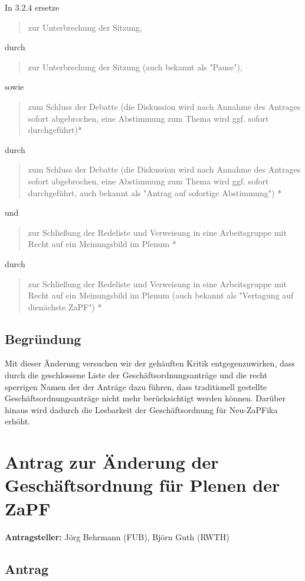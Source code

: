\documentclass[draft,10pt,oneside]{scrartcl}
\begin{document}
In 3.2.4 ersetze
\begin{quote}
	zur Unterbrechung der Sitzung,
\end{quote}
durch
\begin{quote}
	zur Unterbrechung der Sitzung (auch bekannt als "Pause"),
\end{quote}
sowie
\begin{quote}
	zum Schluss der Debatte (die Diskussion wird nach Annahme des Antrages
	sofort abgebrochen, eine Abstimmung zum Thema wird ggf. sofort
	durchgeführt)*
\end{quote}
durch
\begin{quote}
	zum Schluss der Debatte (die Diskussion wird nach Annahme des Antrages
	sofort abgebrochen, eine Abstimmung zum Thema wird ggf. sofort
	durchgeführt, auch bekannt als "Antrag auf sofortige Abstimmung") *
\end{quote}
und
\begin{quote}
	zur Schließung der Redeliste und Verweisung in eine Arbeitsgruppe mit Recht
	auf ein Meinungsbild im Plenum *
\end{quote}
durch
\begin{quote}
	zur Schließung der Redeliste und Verweisung in eine Arbeitsgruppe mit Recht
	auf ein Meinungsbild im Plenum (auch bekannt als "Vertagung auf dienächste
	ZaPF") *
\end{quote}

\subsection*{Begründung}
Mit dieser Änderung versuchen wir der gehäuften Kritik entgegenzuwirken, dass
durch die geschlossene Liste der Geschäftsordnungsanträge und die recht
sperrigen Namen der der Anträge dazu führen, dass traditionell gestellte
Geschäftsordnungsanträge nicht mehr berücksichtigt werden können.
Darüber hinaus wird dadurch die Lesbarkeit der Geschäftsordnung für Neu-ZaPFika
erhöht.

\newpage

\section*{Antrag zur Änderung der Geschäftsordnung für Plenen der ZaPF}

\textbf{Antragsteller:} Jörg Behrmann (FUB), Björn Guth (RWTH)

\subsection*{Antrag}
\end{document}
